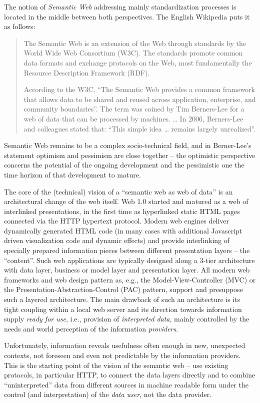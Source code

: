 \documentclass{llncs}
\begin{document}
The notion of \emph{Semantic Web} addressing mainly standardization processes
is located in the middle between both perspectives. The English Wikipedia
\cite{Wikipedia:SemanticWeb} puts it as follows:
\begin{quote}
The Semantic Web is an extension of the Web through standards by the World Wide
Web Consortium (W3C). The standards promote common data formats and exchange
protocols on the Web, most fundamentally the Resource Description Framework
(RDF).

According to the W3C, ``The Semantic Web provides a common framework that
allows data to be shared and reused across application, enterprise, and
community boundaries''. The term was coined by Tim Berners-Lee for a web of
data that can be processed by machines. {\ldots} In 2006, Berners-Lee and
colleagues stated that: ``This simple idea {\ldots} remains largely
unrealized''.
\end{quote}
Semantic Web remains to be a complex socio-technical field, and in Berner-Lee's
statement optimism and pessimism are close together -- the optimistic
perspective concerns the potential of the ongoing development and the
pessimistic one the time horizon of that development to mature.

The core of the (technical) vision of a ``semantic web as web of data'' is an
architectural change of the web itself. Web 1.0 started and matured as a web of
interlinked presentations, in the first time as hyperlinked static HTML pages
connected via the HTTP hypertext protocol. Modern web engines deliver
dynamically generated HTML code (in many cases with additional Javascript
driven visualization code and dynamic effects) and provide interlinking of
specially prepared information pieces between different presentation layers --
the ``content''.  Such web applications are typically designed along a 3-tier
architecture with data layer, business or model layer and presentation layer.
All modern web frameworks and web design pattern as, e.g., the
Model-View-Controller (MVC) or the Presentation-Abstraction-Control (PAC)
pattern, support and presuppose such a layered architecture.  The main drawback
of such an architecture is its tight coupling within a local web server and its
direction towards information supply \emph{ready for use}, i.e., provision of
\emph{interpreted data}, mainly controlled by the needs and world perception of
the information \emph{providers}.

Unfortunately, information reveals usefulness often enough in new, unexpected
contexts, not foreseen and even not predictable by the information
provi\-ders.  This is the starting point of the vision of the semantic web --
use existing protocols, in particular HTTP, to connect the data layers
directly and to combine ``uninterpreted'' data from different sources in
machine readable form under the control (and interpretation) of the \emph{data
  user}, not the data provider.
\end{document}
